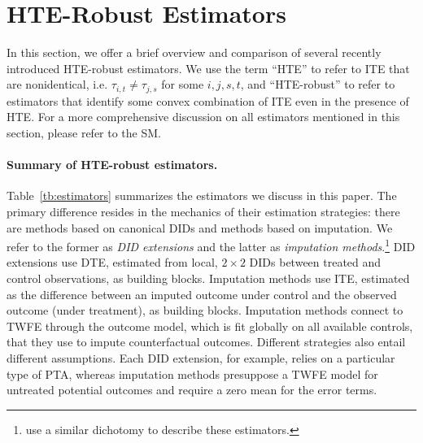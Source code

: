 \documentclass[12pt]{article}
\begin{document}
                                                                                                 
                                                                                                 
                                                                                                 
\section{HTE-Robust Estimators}\label{sc:methods}

In this section, we offer a brief overview and comparison of several recently introduced HTE-robust estimators. We use the term ``HTE'' to refer to ITE that are nonidentical, i.e. $\tau_{i,t} \neq \tau_{j,s}$ for some $i, j, s, t$,  and ``HTE-robust'' to refer to estimators that identify some convex combination of ITE even in the presence of HTE. For a more comprehensive discussion on all estimators mentioned in this section, please refer to the SM. 

\paragraph*{Summary of HTE-robust estimators.} Table~\ref{tb:estimators} summarizes the estimators we discuss in this paper. The primary difference resides in the mechanics of their estimation strategies: there are methods based on canonical DIDs and methods based on imputation. We refer
to the former as \emph{DID extensions} and the latter as \emph{imputation
methods}.\footnote{\citet{LSZ2022} use a similar dichotomy to describe these estimators.} DID extensions use DTE, estimated from local, $2\times2$ DIDs between treated and control observations, as building blocks. Imputation methods use ITE, estimated as the difference between an imputed outcome under control and the observed outcome (under treatment), as building blocks. Imputation methods connect to TWFE through the outcome model, which is fit globally on all available controls, that they use to impute counterfactual outcomes. Different strategies also entail different assumptions. Each DID extension, for example, relies on a particular type of PTA, whereas imputation methods presuppose a TWFE model for untreated potential outcomes and require a zero mean for the error terms.
\end{document}
